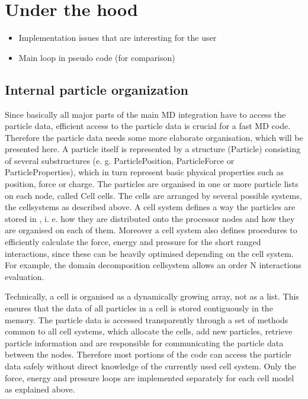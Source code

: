 \chapter{Under the hood}
\label{chap:underhood}

\begin{itemize}
\item Implementation issues that are interesting for the user
\item Main loop in pseudo code (for comparison)
\end{itemize}

\section{Internal particle organization}
\label{sec:internal-particle-organization}

Since basically all major parts of the main MD integration have to
access the particle data, efficient access to the particle data is
crucial for a fast MD code. Therefore the particle data needs some
more elaborate organisation, which will be presented here. A particle
itself is represented by a structure (Particle) consisting of several
substructures (e. g. ParticlePosition, ParticleForce or
ParticleProperties), which in turn represent basic physical properties
such as position, force or charge. The particles are organised in one
or more particle lists on each node, called Cell cells. The cells are
arranged by several possible systems, the cellsystems as described
above. A cell system defines a way the particles are stored in \es{},
i. e. how they are distributed onto the processor nodes and how they
are organised on each of them. Moreover a cell system also defines
procedures to efficiently calculate the force, energy and pressure for
the short ranged interactions, since these can be heavily optimised
depending on the cell system. For example, the domain decomposition
cellsystem allows an order N interactions evaluation.

Technically, a cell is organised as a dynamically growing array, not
as a list. This ensures that the data of all particles in a cell is
stored contiguously in the memory. The particle data is accessed
transparently through a set of methods common to all cell systems,
which allocate the cells, add new particles, retrieve particle
information and are responsible for communicating the particle data
between the nodes. Therefore most portions of the code can access the
particle data safely without direct knowledge of the currently used
cell system. Only the force, energy and pressure loops are implemented
separately for each cell model as explained above.

